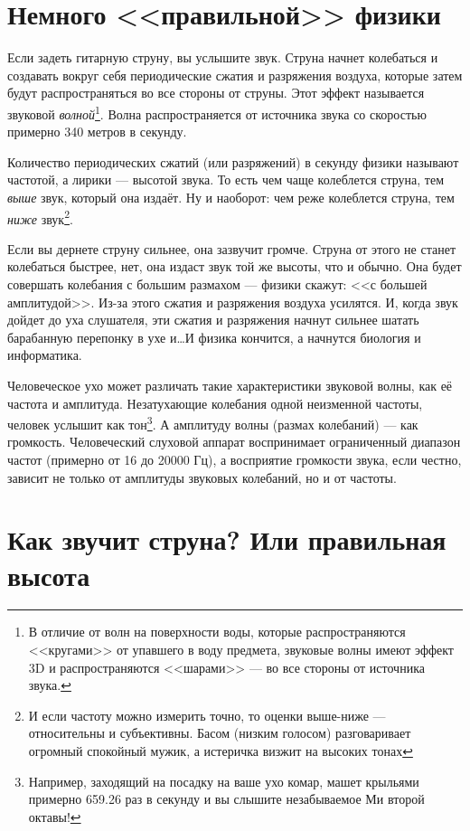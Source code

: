 \section{Немного <<правильной>> физики}

Если задеть гитарную струну, вы услышите звук. Струна начнет колебаться и создавать вокруг себя периодические сжатия и разряжения воздуха, которые затем будут распространяться во все стороны от струны. Этот эффект называется звуковой \emph{волной}\footnote{В отличие от волн на поверхности воды, которые распространяются <<кругами>> от упавшего в воду предмета, звуковые волны имеют эффект 3D и распространяются <<шарами>> --- во все стороны от источника звука.}. Волна распространяется от источника звука со скоростью примерно 340 метров в секунду.

Количество периодических сжатий (или разряжений) в секунду физики называют частотой, а лирики --- высотой звука. То есть чем чаще колеблется струна, тем \emph{выше} звук, который она издаёт. Ну и наоборот: чем реже колеблется струна, тем \emph{ниже} звук\footnote{И если частоту можно измерить точно, то оценки выше-ниже --- относительны и субъективны. Басом (низким голосом) разговаривает огромный спокойный мужик, а истеричка визжит на высоких тонах}.

Если вы дернете струну сильнее, она зазвучит громче. Струна от этого не станет колебаться быстрее, нет, она издаст звук той же высоты, что и обычно. Она будет совершать колебания с большим размахом --- физики скажут: <<с большей амплитудой>>. Из-за этого сжатия и разряжения воздуха усилятся. И, когда звук дойдет до уха слушателя, эти сжатия и разряжения начнут сильнее шатать барабанную перепонку в ухе и\ldots И физика кончится, а начнутся биология и информатика.

Человеческое ухо может различать такие характеристики звуковой волны, как её частота и амплитуда. Незатухающие колебания одной неизменной частоты, человек услышит как тон\footnote{Например, заходящий на посадку на ваше ухо комар, машет крыльями примерно 659.26 раз в секунду и вы слышите незабываемое Ми второй октавы!}. А амплитуду волны (размах колебаний) --- как громкость. Человеческий слуховой аппарат воспринимает ограниченный диапазон частот (примерно от 16 до 20000 Гц), а восприятие громкости звука, если честно, зависит не только от амплитуды звуковых колебаний, но и от частоты.


\section{Как звучит струна? Или правильная высота}


